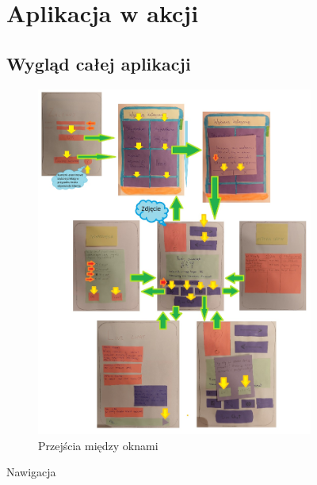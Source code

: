 \documentclass[12pt]{article}
\begin{document}
\clearpage


\begin{figure}[h!]
	\section {Aplikacja w akcji}
	\subsection{Wygląd całej aplikacji}
	\centering
	\begin{subfigure}[b]{1\linewidth}
		\includegraphics[width=\linewidth]{zdj/mozaika.jpg}
		\caption{Przejścia między oknami}
	\end{subfigure}
	\label{fig:nuty}
	\caption{Nawigacja}
\end{figure}

\clearpage
\end{document}
